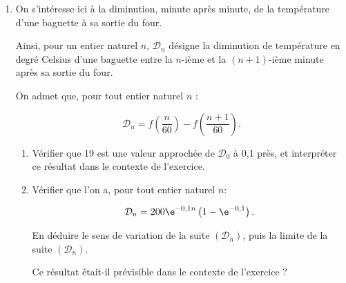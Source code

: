 \begin{enumerate}
\item On s’intéresse ici à la diminution, minute après minute, de la température d’une baguette à sa sortie du four.

Ainsi, pour un entier naturel $n$, $\mathcal{D}_n$ désigne la diminution de température en degré Celsius d’une baguette entre la $n$-ième et la $(n+1)$-ième minute après sa sortie du four.

On admet que, pour tout entier naturel $n$ : 

\[\mathcal{D}_n=f\left(\dfrac{n}{60}\right)-f\left(\dfrac{n+1}{60}\right).\]

\smallskip

	\begin{enumerate}
		\item Vérifier que 19 est une valeur approchée de $\mathcal{D}_0$ à 0,1 près, et interpréter ce résultat dans le contexte de l’exercice.
\item Vérifier que l’on a, pour tout entier naturel $n$: 

\[\mathcal{D}_n = 200 \e^{-0,1n}\left(1 - \e^{-0,1}\right).\]

En déduire le sens de variation de la suite $\left(\mathcal{D}_n\right)$, puis la limite de la suite $\left(\mathcal{D}_n\right)$.

Ce résultat était-il prévisible dans le contexte de l’exercice ?

		\end{enumerate}
\end{enumerate}
